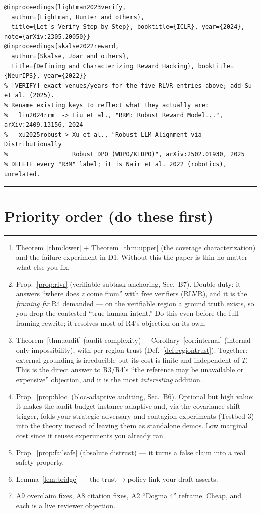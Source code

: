 \documentclass[11pt]{article}
\theoremstyle{definition}
\theoremstyle{remark}
\begin{document}
\begin{verbatim}
@inproceedings{lightman2023verify,
  author={Lightman, Hunter and others},
  title={Let's Verify Step by Step}, booktitle={ICLR}, year={2024}, note={arXiv:2305.20050}}
@inproceedings{skalse2022reward,
  author={Skalse, Joar and others},
  title={Defining and Characterizing Reward Hacking}, booktitle={NeurIPS}, year={2022}}
% [VERIFY] exact venues/years for the five RLVR entries above; add Su et al. (2025).
% Rename existing keys to reflect what they actually are:
%   liu2024rrm  -> Liu et al., "RRM: Robust Reward Model...", arXiv:2409.13156, 2024
%   xu2025robust-> Xu et al., "Robust LLM Alignment via Distributionally
%                  Robust DPO (WDPO/KLDPO)", arXiv:2502.01930, 2025
% DELETE every "R3M" label; it is Nair et al. 2022 (robotics), unrelated.
\end{verbatim}

\bigskip
\hrule
\section*{Priority order (do these first)}
\hrule
\begin{enumerate}[nosep]
\item Theorem~\ref{thm:lower} + Theorem~\ref{thm:upper} (the coverage characterization) and the
failure experiment in D1. Without this the paper is thin no matter what else you fix.
\item Prop.~\ref{prop:rlvr} (verifiable-subtask anchoring, Sec.~B7). Double duty: it answers ``where
does $z$ come from'' with free verifiers (RLVR), and it is the \emph{framing fix} R4 demanded ---
on the verifiable region a ground truth exists, so you drop the contested ``true human intent.'' Do
this even before the full framing rewrite; it resolves most of R4's objection on its own.
\item Theorem~\ref{thm:audit} (audit complexity) $+$ Corollary~\ref{cor:internal} (internal-only
impossibility), with per-region trust (Def.~\ref{def:regiontrust}). Together: external grounding is
irreducible but its cost is finite and independent of $T$. This is the direct answer to R3/R4's
``the reference may be unavailable or expensive'' objection, and it is the most \emph{interesting}
addition.
\item Prop.~\ref{prop:bloc} (bloc-adaptive auditing, Sec.~B6). Optional but high value: it makes the
audit budget instance-adaptive and, via the covariance-shift trigger, folds your strategic-adversary
and contagion experiments (Testbed 3) into the theory instead of leaving them as standalone demos.
Low marginal cost since it reuses experiments you already ran.
\item Prop.~\ref{prop:failsafe} (absolute distrust) --- it turns a false claim into a real safety
property.
\item Lemma~\ref{lem:bridge} --- the trust$\to$policy link your draft asserts.
\item A9 overclaim fixes, A8 citation fixes, A2 ``Dogma 4'' reframe. Cheap, and each is a live
reviewer objection.
\end{enumerate}
\end{document}

